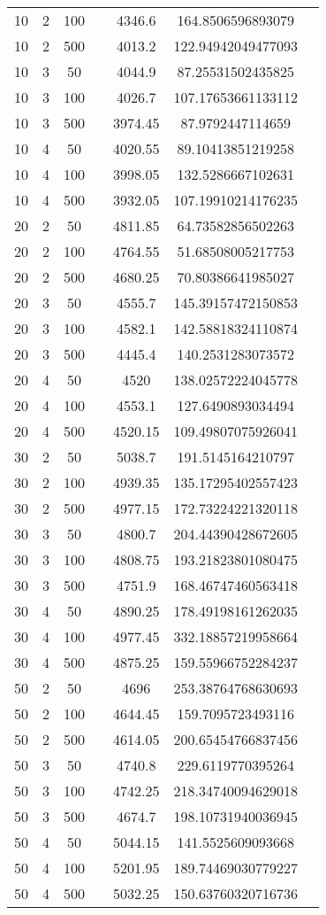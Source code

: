 {\begin{longtabu}{S
S
S
S
S
S[round-mode=places, round-precision=0]
S[round-mode=places, round-precision=0]}
10 & 2 & 100 & & 4346.6 & 164.8506596893079 \\
10 & 2 & 500 & & 4013.2 & 122.94942049477093 \\
10 & 3 & 50 & & 4044.9 & 87.25531502435825 \\
10 & 3 & 100 & & 4026.7 & 107.17653661133112 \\
10 & 3 & 500 & & 3974.45 & 87.9792447114659 \\
10 & 4 & 50 & & 4020.55 & 89.10413851219258 \\
10 & 4 & 100 & & 3998.05 & 132.5286667102631 \\
10 & 4 & 500 & & 3932.05 & 107.19910214176235 \\
20 & 2 & 50 & & 4811.85 & 64.73582856502263 \\
20 & 2 & 100 & & 4764.55 & 51.68508005217753 \\
20 & 2 & 500 & & 4680.25 & 70.80386641985027 \\
20 & 3 & 50 & & 4555.7 & 145.39157472150853 \\
20 & 3 & 100 & & 4582.1 & 142.58818324110874 \\
20 & 3 & 500 & & 4445.4 & 140.2531283073572 \\
20 & 4 & 50 & & 4520 & 138.02572224045778 \\
20 & 4 & 100 & & 4553.1 & 127.6490893034494 \\
20 & 4 & 500 & & 4520.15 & 109.49807075926041 \\
30 & 2 & 50 & & 5038.7 & 191.5145164210797 \\
30 & 2 & 100 & & 4939.35 & 135.17295402557423 \\
30 & 2 & 500 & & 4977.15 & 172.73224221320118 \\
30 & 3 & 50 & & 4800.7 & 204.44390428672605 \\
30 & 3 & 100 & & 4808.75 & 193.21823801080475 \\
30 & 3 & 500 & & 4751.9 & 168.46747460563418 \\
30 & 4 & 50 & & 4890.25 & 178.49198161262035 \\
30 & 4 & 100 & & 4977.45 & 332.18857219958664 \\
30 & 4 & 500 & & 4875.25 & 159.55966752284237 \\
50 & 2 & 50 & & 4696 & 253.38764768630693 \\
50 & 2 & 100 & & 4644.45 & 159.7095723493116 \\
50 & 2 & 500 & & 4614.05 & 200.65454766837456 \\
50 & 3 & 50 & & 4740.8 & 229.6119770395264 \\
50 & 3 & 100 & & 4742.25 & 218.34740094629018 \\
50 & 3 & 500 & & 4674.7 & 198.10731940036945 \\
50 & 4 & 50 & & 5044.15 & 141.5525609093668 \\
50 & 4 & 100 & & 5201.95 & 189.74469030779227 \\
50 & 4 & 500 & & 5032.25 & 150.63760320716736 \\
\hline
\end{longtabu}

}